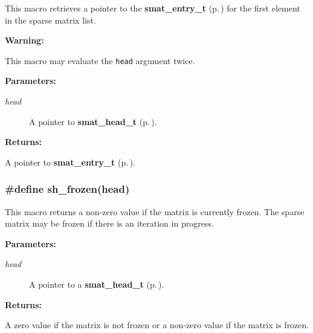  This macro retrieves a pointer to the {\bf smat\_\-entry\_\-t} {\rm (p.\,\pageref{group__dbprim__smat_a2})} for the first element in the sparse matrix list.

\begin{Desc}
\item[{\bf Warning: }]\par
This macro may evaluate the {\tt head} argument twice.\end{Desc}
\begin{Desc}
\item[{\bf Parameters: }]\par
\begin{description}
\item[
{\em head}]A pointer to {\bf smat\_\-head\_\-t} {\rm (p.\,\pageref{group__dbprim__smat_a1})}.

\end{description}
\end{Desc}
\begin{Desc}
\item[{\bf Returns: }]\par
A pointer to {\bf smat\_\-entry\_\-t} {\rm (p.\,\pageref{group__dbprim__smat_a2})}. \end{Desc}
\subsubsection{\setlength{\rightskip}{0pt plus 5cm}\#define sh\_\-frozen(head)}\label{group__dbprim__smat_a33}




 This macro returns a non-zero value if the matrix is currently frozen. The sparse matrix may be frozen if there is an iteration in progress.\begin{Desc}
\item[{\bf Parameters: }]\par
\begin{description}
\item[
{\em head}]A pointer to a {\bf smat\_\-head\_\-t} {\rm (p.\,\pageref{group__dbprim__smat_a1})}.

\end{description}
\end{Desc}
\begin{Desc}
\item[{\bf Returns: }]\par
A zero value if the matrix is not frozen or a non-zero value if the matrix is frozen. \end{Desc}
